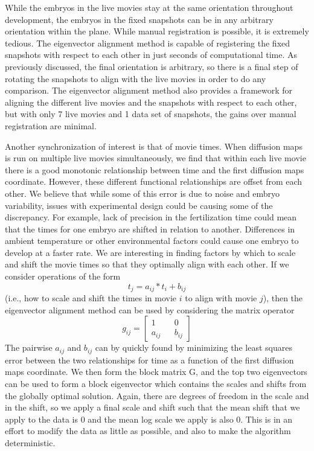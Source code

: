 \documentclass[12pt]{article}
\begin{document}
While the embryos in the live movies stay at the same orientation throughout development, the embryos in the fixed snapshots can be in any arbitrary orientation within the plane. While manual registration is possible, it is extremely tedious. The eigenvector alignment method is capable of registering the fixed snapshots with respect to each other in just seconds of computational time. As previously discussed, the final orientation is arbitrary, so there is a final step of rotating the snapshots to align with the live movies in order to do any comparison. The eigenvector alignment method also provides a framework for aligning the different live movies and the snapshots with respect to each other, but with only 7 live movies and 1 data set of snapshots, the gains over manual registration are minimal. \vspace{1mm}

Another synchronization of interest is that of movie times.  When diffusion maps is run on multiple live movies simultaneously, we find that within each live movie there is a good monotonic relationship between time and the first diffusion maps coordinate. However, these different functional relationships are offset from each other. We believe that while some of this error is due to noise and embryo variability, issues with experimental design could be causing some of the discrepancy. For example, lack of precision in the fertilization time could mean that the times for one embryo are shifted in relation to another. Differences in ambient temperature or other environmental factors could cause one embryo to develop at a faster rate. We are interesting in finding factors by which to scale and shift the movie times so that they optimally align with each other. If we consider operations of the form
\[
t_j = a_{ij}*t_i+b_{ij}
\]
(i.e., how to scale and shift the times in movie $i$ to align with movie $j$), then the eigenvector alignment method can be used by considering the matrix operator
\[
g_{ij}=
\begin{bmatrix}
1 && 0\\
a_{ij} && b_{ij}
\end{bmatrix}
\]
The pairwise $a_{ij}$ and $b_{ij}$ can by quickly found by minimizing the least squares error between the two relationships for time as a function of the first diffusion maps coordinate. We then form the block matrix G, and the top two eigenvectors can be used to form a block eigenvector which contains the scales and shifts from the globally optimal solution. Again, there are degrees of freedom in the scale and in the shift, so we apply a final scale and shift such that the mean shift that we apply to the data is 0 and the mean log scale we apply is also 0. This is in an effort to modify the data as little as possible, and also to make the algorithm deterministic.
\end{document}
